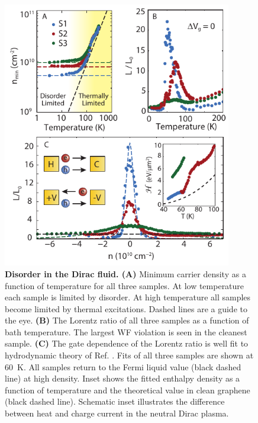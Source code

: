 \begin{figure}
\centering
\includegraphics[width=100mm]{figures/Dirac_fluid/Fig3.pdf}
\caption{\textbf{Disorder in the Dirac fluid.  (A)} Minimum carrier density as a function of temperature for all three samples.  At low temperature each sample is limited by disorder. At high temperature all samples become limited by thermal excitations.  Dashed lines are a guide to the eye. \textbf{(B)} The Lorentz ratio of all three samples as a function of bath temperature. The largest WF violation is seen in the cleanest sample. \textbf{(C)} The gate dependence of the Lorentz ratio is well fit to hydrodynamic theory of Ref. \cite{muller_quantum-critical_2008, foster_slow_2009}. Fits of all three samples are shown at 60~K. All samples return to the Fermi liquid value (black dashed line) at high density. Inset shows the fitted enthalpy density as a function of temperature and the theoretical value in clean graphene (black dashed line). Schematic inset illustrates the difference between heat and charge current in the neutral Dirac plasma.}
\label{fig:DF_Fig3}
\end{figure}

